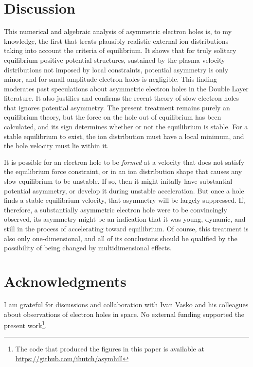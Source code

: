 \documentclass[12pt]{article}
\begin{document}
\section{Discussion}

This numerical and algebraic analysis of asymmetric electron holes is,
to my knowledge, the first that treats plausibly realistic external
ion distributions taking into account the criteria of equilibrium. It
shows that for truly solitary equilibrium positive potential
structures, sustained by the plasma velocity distributions not imposed by local
constraints, potential asymmetry is only minor, and for small
amplitude electron holes is negligible.  This finding moderates past
speculations about asymmetric electron holes in the Double Layer
literature. It also justifies and confirms the recent
theory\cite{Hutchinson2021c} of slow electron holes that ignores
potential asymmetry. The present treatment remains purely an
equilibrium theory, but the force on the hole out of equilibrium has
been calculated, and its sign determines whether or not the equilibrium
is stable. For a stable equilibrium to exist, the ion distribution
must have a local minimum, and the hole velocity must lie within it.

It is possible for an electron hole to be \emph{formed} at a velocity
that does not satisfy the equilibrium force constraint, or in an ion
distribution shape that causes any slow equilibrium to be unstable. If
so, then it might initally have substantial potential asymmetry, or
develop it during unstable acceleration. But once a hole finds a stable
equilibrium velocity, that asymmetry will be largely suppressed. If,
therefore, a substantially asymmetric electron hole were to be
convincingly observed, its asymmetry might be an indication that it
was young, dynamic, and still in the process of accelerating toward
equilibrium. Of course, this treatment is also only one-dimensional,
and all of its conclusions should be qualified by the possibility of
being changed by multidimensional effects.

\section*{Acknowledgments}
I am grateful for discussions and collaboration with Ivan Vasko and
his colleagues about observations of electron holes in space. No
external funding supported the present work\footnote{The code that
  produced the figures in this paper is available at
  \url{https://github.com/ihutch/asymhill}}.


\end{document}
